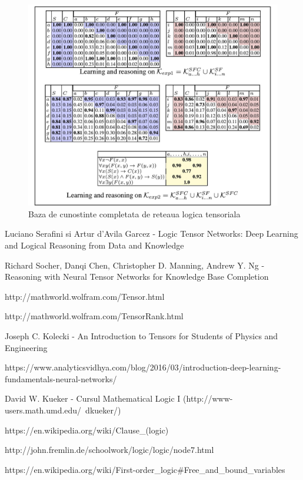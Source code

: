 \documentclass{article}
\begin{document}
\begin{figure}[H]
	\includegraphics[scale=0.2]{table}
	\caption{Baza de cunostinte completata de reteaua logica tensoriala \cite{LTN}}
\end{figure}


\begin{thebibliography}{9}
	Luciano Serafini si Artur d'Avila Garcez - Logic Tensor Networks: Deep Learning and Logical Reasoning from Data and Knowledge
	
	Richard Socher, Danqi Chen, Christopher D. Manning, Andrew Y. Ng - Reasoning with Neural Tensor Networks for Knowledge Base Completion

	http://mathworld.wolfram.com/Tensor.html

	http://mathworld.wolfram.com/TensorRank.html
	
	Joseph C. Kolecki - An Introduction to Tensors for Students of Physics and Engineering

	https://www.analyticsvidhya.com/blog/2016/03/introduction-deep-learning-fundamentals-neural-networks/
	
	David W. Kueker - Cursul Mathematical Logic I (http://www-users.math.umd.edu/~dkueker/)
	
	https://en.wikipedia.org/wiki/Clause\_(logic)
	
	http://john.fremlin.de/schoolwork/logic/logic/node7.html
	
	https://en.wikipedia.org/wiki/First-order\_logic\#Free\_and\_bound\_variables

\end{thebibliography}
\end{document}
